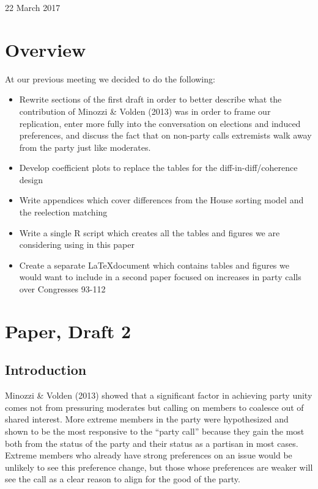 \documentclass[12pt]{article}
\begin{document}
	
\begin{center}
	\Large 22 March 2017
\end{center}

\section{Overview}

At our previous meeting we decided to do the following:
\begin{itemize}
	\item Rewrite sections of the first draft in order to better describe what the contribution of Minozzi \& Volden (2013) was in order to frame our replication, enter more fully into the conversation on elections and induced preferences, and discuss the fact that on non-party calls extremists walk away from the party just like moderates.
	
	\item Develop coefficient plots to replace the tables for the diff-in-diff/coherence design
	
	\item Write appendices which cover differences from the House sorting model and the reelection matching
	
	\item Write a single R script which creates all the tables and figures we are considering using in this paper
	
	\item Create a separate \LaTeX document which contains tables and figures we would want to include in a second paper focused on increases in party calls over Congresses 93-112
\end{itemize}

\pagebreak

\section{Paper, Draft 2}

\subsection{Introduction}

Minozzi \& Volden (2013) showed that a significant factor in achieving party unity comes not from pressuring moderates but calling on members to coalesce out of shared interest. More extreme members in the party were hypothesized and shown to be the most responsive to the ``party call'' because they gain the most both from the status of the party and their status as a partisan in most cases. Extreme members who already have strong preferences on an issue would be unlikely to see this preference change, but those whose preferences are weaker will see the call as a clear reason to align for the good of the party.
\end{document}

